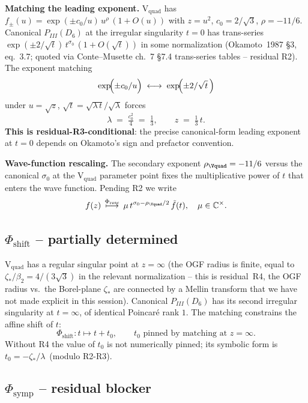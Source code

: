 \textbf{Matching the leading exponent.} V$_\mathrm{quad}$
has $f_\pm(u) = \exp(\pm c_0/u)\, u^\rho\,(1+O(u))$ with
$z = u^2$, $c_0 = 2/\sqrt 3$, $\rho = -11/6$. Canonical
$P_{III}(D_6)$ at the irregular singularity $t=0$ has
trans-series $\exp(\pm 2/\sqrt{t})\,t^{\sigma_0}\,(1+O(\sqrt t))$
in some normalization (Okamoto~1987 \S3, eq.~3.7; quoted via
Conte--Musette ch.~7 \S7.4 trans-series tables -- residual
\textsf{R2}). The exponent matching
\[
  \exp\!\Bigl(\pm c_0 / u\Bigr) \;\longleftrightarrow\;
  \exp\!\Bigl(\pm 2 / \sqrt{t}\,\Bigr)
\]
under $u = \sqrt{z}$, $\sqrt{t} = \sqrt{\lambda\,t} / \sqrt{\lambda}$
forces
\[
  \boxed{\;
    \lambda \;=\; \tfrac{c_0^2}{4} \;=\; \tfrac{1}{3},
    \qquad
    z \;=\; \tfrac{1}{3}\,t.
  \;}
\]
\textbf{This is residual-R3-conditional}: the precise
canonical-form leading exponent at $t=0$ depends on Okamoto's
sign and prefactor convention.

\textbf{Wave-function rescaling.} The secondary exponent
$\rho_{\Vquad} = -11/6$ versus the canonical $\sigma_0$ at the
V$_\mathrm{quad}$ parameter point fixes the multiplicative
power of $t$ that enters the wave function. Pending R2 we
write
\[
  f(z)\, \stackrel{\Phi_\mathrm{resc}}{\longmapsto}\,
  \mu\, t^{\sigma_0 - \rho_{\Vquad}/2}\, \tilde f(t),
  \quad \mu \in \mathbb{C}^\times.
\]

\subsection*{$\Phi_\mathrm{shift}$ -- partially determined}

V$_\mathrm{quad}$ has a regular singular point at
$z=\infty$ (the OGF radius is finite, equal to
$\zeta_* / \beta_2 = 4/(3\sqrt 3)$ in the relevant normalization
-- this is residual~\textsf{R4}, the OGF radius vs.\ the
Borel-plane $\zeta_*$ are connected by a Mellin transform that
we have not made explicit in this session). Canonical
$P_{III}(D_6)$ has its second irregular singularity at
$t=\infty$, of identical Poincar\'e rank $1$. The matching
constrains the affine shift of $t$:
\[
  \Phi_\mathrm{shift}: t \mapsto t + t_0,
  \qquad t_0 \text{ pinned by matching at } z=\infty.
\]
Without R4 the value of $t_0$ is not numerically pinned;
its symbolic form is $t_0 = -\zeta_*\!/\lambda\,$
(modulo R2-R3).

\subsection*{$\Phi_\mathrm{symp}$ -- residual blocker}

